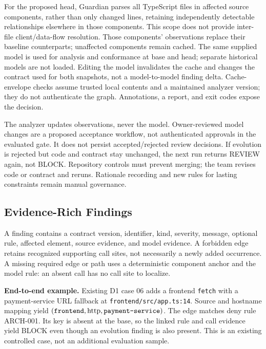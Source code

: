 \documentclass[conference]{IEEEtran}
\begin{document}
For the proposed head, Guardian parses all TypeScript files in affected source components, rather than only changed lines, retaining independently detectable relationships elsewhere in those components. This scope does not provide inter-file client/data-flow resolution. Those components' observations replace their baseline counterparts; unaffected components remain cached. The same supplied model is used for analysis and conformance at base and head; separate historical models are not loaded. Editing the model invalidates the cache and changes the contract used for both snapshots, not a model-to-model finding delta. Cache-envelope checks assume trusted local contents and a maintained analyzer version; they do not authenticate the graph. Annotations, a report, and exit codes expose the decision.

The analyzer updates observations, never the model. Owner-reviewed model changes are a proposed acceptance workflow, not authenticated approvals in the evaluated gate. It does not persist accepted/rejected review decisions. If evolution is rejected but code and contract stay unchanged, the next run returns REVIEW again, not BLOCK. Repository controls must prevent merging; the team revises code or contract and reruns. Rationale recording and new rules for lasting constraints remain manual governance.

\subsection{Evidence-Rich Findings}

A finding contains a contract version, identifier, kind, severity, message, optional rule, affected element, source evidence, and model evidence. A forbidden edge retains recognized supporting call sites, not necessarily a newly added occurrence. A missing required edge or path uses a deterministic component anchor and the model rule: an absent call has no call site to localize.

\textbf{End-to-end example.} Existing D1 case 06 adds a frontend \texttt{fetch} with a payment-service URL fallback at \texttt{frontend/src/app.ts:14}. Source and hostname mapping yield $(\texttt{frontend},\mathrm{http},\texttt{payment\mbox{-}service})$. The edge matches deny rule ARCH-001. Its key is absent at the base, so the linked rule and call evidence yield BLOCK even though an evolution finding is also present. This is an existing controlled case, not an additional evaluation sample.
\end{document}
